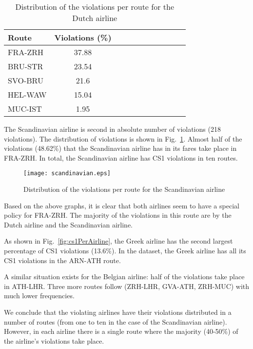 \begin{table}[H]
\caption{Distribution of the violations per route for the Dutch airline}
\centering
\begin{tabular}{l*{10}{c}}
Route & Violations (\%) \\
\hline
FRA-ZRH & 37.88 \\
BRU-STR & 23.54 \\
SVO-BRU & 21.6 \\
HEL-WAW & 15.04 \\
MUC-IST & 1.95 \\
\end{tabular}
\label{tab:KLM}
\end{table}
The Scandinavian airline is second in absolute number of violations (218 violations). 
The distribution of violations is shown in Fig.~\ref{fig:The Scandinavian airline}. 
Almost half of the violations (48.62\%) that the Scandinavian airline has in its fares take place in FRA-ZRH. 
In total, the Scandinavian airline has CS1 violations in ten routes.

\begin{figure}[H]
\centering
\texttt{[image: scandinavian.eps]}
\caption{Distribution of the violations per route for the Scandinavian airline}
\label{fig:The Scandinavian airline}
\end{figure}

Based on the above graphs, it is clear that both airlines seem to have a 
special policy for FRA-ZRH. The majority of the violations in this route are by the Dutch airline and the Scandinavian airline.

As shown in Fig.~\ref{fig:cs1PerAirline}, the Greek airline has the second largest
percentage of CS1 violations (13.6\%). 
In the dataset, the Greek airline has all its CS1 violations in the ARN-ATH route.

A similar situation exists for the Belgian airline: half of the violations take place in 
ATH-LHR. Three more routes follow (ZRH-LHR, GVA-ATH, ZRH-MUC) with much lower frequencies.

We conclude that the violating airlines have their violations 
distributed in a number of routes (from one to ten in the case of the Scandinavian airline).
However, in each airline there is a single route where the majority (40-50\%)
of the airline's violations take place.
